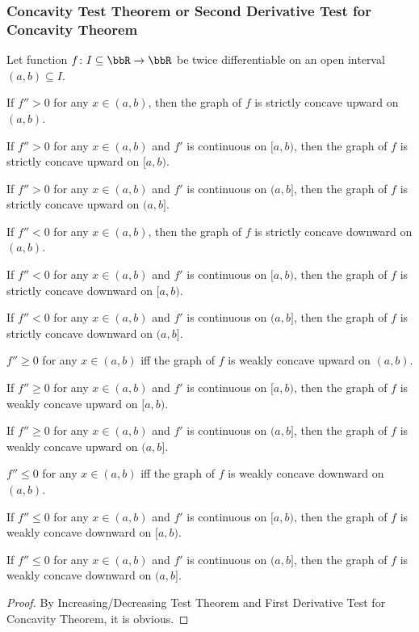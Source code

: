 \subsubsection{Concavity Test Theorem or Second Derivative Test for Concavity Theorem}
Let function $f\colon I\subseteq\bbR\to\bbR$ be twice differentiable on an open interval $(a,b)\subseteq I$.
\bit
\item If $f''>0$ for any $x\in (a,b)$, then the graph of $f$ is strictly concave upward on $(a,b)$.
\item If $f''>0$ for any $x\in (a,b)$ and $f'$ is continuous on $[a,b)$, then the graph of $f$ is strictly concave upward on $[a,b)$.
\item If $f''>0$ for any $x\in (a,b)$ and $f'$ is continuous on $(a,b]$, then the graph of $f$ is strictly concave upward on $(a,b]$.
\item If $f''<0$ for any $x\in (a,b)$, then the graph of $f$ is strictly concave downward on $(a,b)$.
\item If $f''<0$ for any $x\in (a,b)$ and $f'$ is continuous on $[a,b)$, then the graph of $f$ is strictly concave downward on $[a,b)$.
\item If $f''<0$ for any $x\in (a,b)$ and $f'$ is continuous on $(a,b]$, then the graph of $f$ is strictly concave downward on $(a,b]$.
\item $f''\geq 0$ for any $x\in (a,b)$ iff the graph of $f$ is weakly concave upward on $(a,b)$.
\item If $f''\geq 0$ for any $x\in (a,b)$ and $f'$ is continuous on $[a,b)$, then the graph of $f$ is weakly concave upward on $[a,b)$.
\item If $f''\geq 0$ for any $x\in (a,b)$ and $f'$ is continuous on $(a,b]$, then the graph of $f$ is weakly concave upward on $(a,b]$.
\item $f''\leq 0$ for any $x\in (a,b)$ iff the graph of $f$ is weakly concave downward on $(a,b)$.
\item If $f''\leq 0$ for any $x\in (a,b)$ and $f'$ is continuous on $[a,b)$, then the graph of $f$ is weakly concave downward on $[a,b)$.
\item If $f''\leq 0$ for any $x\in (a,b)$ and $f'$ is continuous on $(a,b]$, then the graph of $f$ is weakly concave downward on $(a,b]$.
\eit
\begin{proof}
By Increasing/Decreasing Test Theorem and First Derivative Test for Concavity Theorem, it is obvious.
\end{proof}
